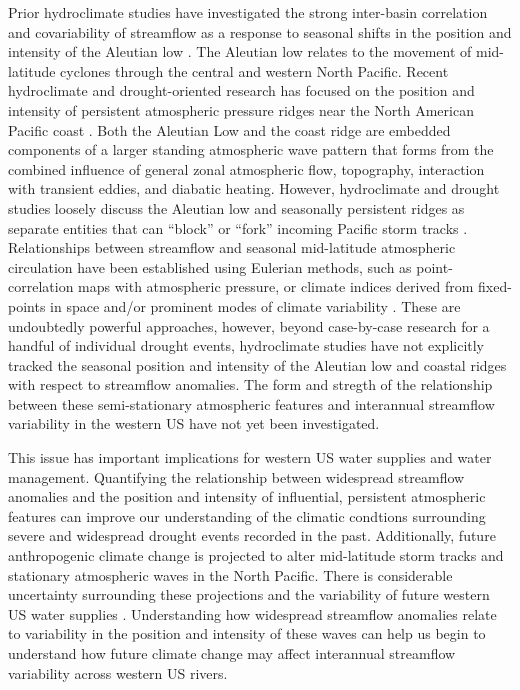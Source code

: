 \documentclass[final, double]{ua-thesis}
\begin{document}
Prior hydroclimate studies have investigated the strong inter-basin correlation and covariability of streamflow as a response to seasonal shifts in the position and intensity of the Aleutian low \citep{2cayan_influence_1989}. The Aleutian low relates to the movement of mid-latitude cyclones through the central and western North Pacific. Recent hydroclimate and drought-oriented research has focused on the position and intensity of persistent atmospheric pressure ridges near the North American Pacific coast \citep{2cook_worst_2014, 2seager_causes_2014, 2wise_persistence_2014, 2seager_causes_2015, 2swain_tale_2015, 2choi_uncertainty_2016, 2wise_five_2016}. Both the Aleutian Low and the coast ridge are embedded components of a larger standing atmospheric wave pattern that forms from the combined influence of general zonal atmospheric flow, topography, interaction with transient eddies, and diabatic heating. However, hydroclimate and drought studies loosely discuss the Aleutian low and seasonally persistent ridges as separate entities that can ``block'' or ``fork'' incoming Pacific storm tracks \citep[e.g., ][]{2cayan_influence_1989, 2sheppard_climate_2002}. Relationships between streamflow and seasonal mid-latitude atmospheric circulation have been established using Eulerian methods, such as point-correlation maps with atmospheric pressure, or climate indices derived from fixed-points in space and/or prominent modes of climate variability \citep[e.g., ][]{2wallace_teleconnections_1981}. These are undoubtedly powerful approaches, however, beyond case-by-case research for a handful of individual drought events, hydroclimate studies have not explicitly tracked the seasonal position and intensity of the Aleutian low and coastal ridges with respect to streamflow anomalies. The form and stregth of the relationship between these semi-stationary atmospheric features and interannual streamflow variability in the western US have not yet been investigated.

This issue has important implications for western US water supplies and water management. Quantifying the relationship between widespread streamflow anomalies and the position and intensity of influential, persistent atmospheric features can improve our understanding of the climatic condtions surrounding severe and widespread drought events recorded in the past. Additionally, future anthropogenic climate change is projected to alter mid-latitude storm tracks and stationary atmospheric waves in the North Pacific. There is considerable uncertainty surrounding these projections and the variability of future western US water supplies \citep{2dettinger_western_2015, 2langenbrunner_patterns_2015, 2choi_uncertainty_2016}. Understanding how widespread streamflow anomalies relate to variability in the position and intensity of these waves can help us begin to understand how future climate change may affect interannual streamflow variability across western US rivers.
\end{document}
